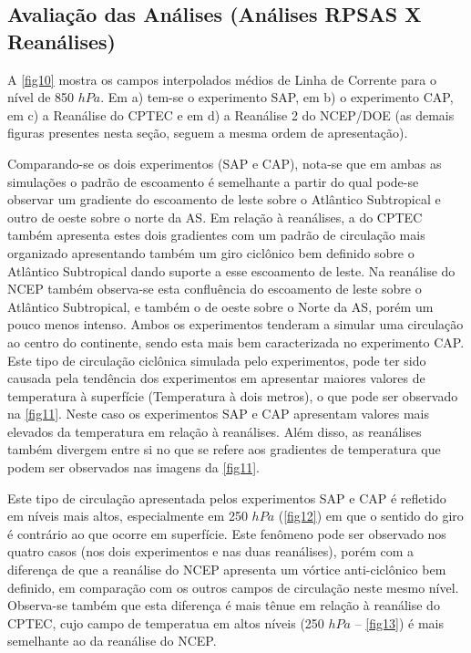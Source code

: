\subsection{Avaliação das Análises (Análises RPSAS X Reanálises)}
\label{ss:avalanl}

A \autoref{fig10} mostra os campos interpolados médios de Linha de Corrente para o nível de 850 $hPa$. Em a) tem-se o experimento SAP, em b) o experimento CAP, em c) a Reanálise do CPTEC e em d) a Reanálise 2 do NCEP/DOE (as demais figuras presentes nesta seção, seguem a mesma ordem de apresentação).

Comparando-se os dois experimentos (SAP e CAP), nota-se que em ambas as simulações o padrão de escoamento é semelhante a partir do qual pode-se observar um gradiente do escoamento de leste sobre o Atlântico Subtropical e outro de oeste sobre o norte da AS. Em relação à reanálises, a do CPTEC também apresenta estes dois gradientes com um padrão de circulação mais organizado apresentando também um giro ciclônico bem definido sobre o Atlântico Subtropical dando suporte a esse escoamento de leste. Na reanálise do NCEP também observa-se esta confluência do escoamento de leste sobre o Atlântico Subtropical, e também o de oeste sobre o Norte da AS, porém um pouco menos intenso. Ambos os experimentos tenderam a simular uma circulação ao centro do continente, sendo esta mais bem caracterizada no experimento CAP. Este tipo de circulação ciclônica simulada pelo experimentos, pode ter sido causada pela tendência dos experimentos em apresentar maiores valores de temperatura à superfície (Temperatura à dois metros), o que pode ser observado na \autoref{fig11}. Neste caso os experimentos SAP e CAP apresentam valores mais elevados da temperatura em relação à reanálises. Além disso, as reanálises também divergem entre si no que se refere aos gradientes de temperatura que podem ser observados nas imagens da \autoref{fig11}. 

Este tipo de circulação apresentada pelos experimentos SAP e CAP é refletido em níveis mais altos, especialmente em 250 $hPa$ (\autoref{fig12}) em que o sentido do giro é contrário ao que ocorre em superfície. Este fenômeno pode ser observado nos quatro casos (nos dois experimentos e nas duas reanálises), porém com a diferença de que a reanálise do NCEP apresenta um vórtice anti-ciclônico bem definido, em comparação com os outros campos de circulação neste mesmo nível. Observa-se também que esta diferença é mais tênue em relação à reanálise do CPTEC, cujo campo de temperatua em altos níveis (250 $hPa$ – \autoref{fig13}) é mais semelhante ao da reanálise do NCEP.



